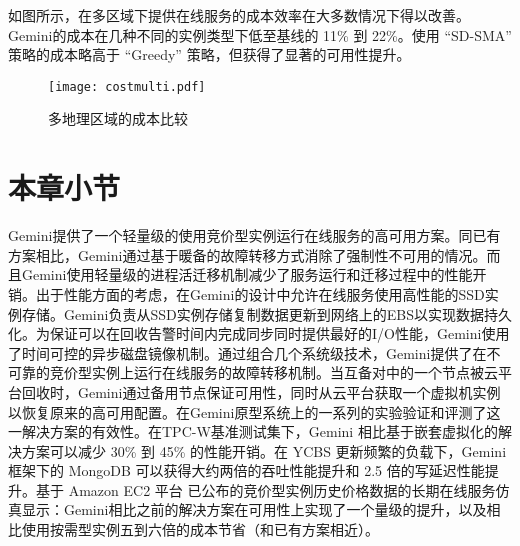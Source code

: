 如图所示，在多区域下提供在线服务的成本效率在大多数情况下得以改善。Gemini的成本在几种不同的实例类型下低至基线的 11\% 到 22\%。使用 ``SD-SMA'' 策略的成本略高于 ``Greedy'' 策略，但获得了显著的可用性提升。
\begin{figure}[]
  \centering
  \texttt{[image: costmulti.pdf]}
  \caption{多地理区域的成本比较}
  \label{figure:costmulti}
\end{figure}

\section{本章小节}
Gemini提供了一个轻量级的使用竞价型实例运行在线服务的高可用方案。同已有方案相比，Gemini通过基于暖备的故障转移方式消除了强制性不可用的情况。而且Gemini使用轻量级的进程活迁移机制减少了服务运行和迁移过程中的性能开销。出于性能方面的考虑，在Gemini的设计中允许在线服务使用高性能的SSD实例存储。Gemini负责从SSD实例存储复制数据更新到网络上的EBS以实现数据持久化。为保证可以在回收告警时间内完成同步同时提供最好的I/O性能，Gemini使用了时间可控的异步磁盘镜像机制。通过组合几个系统级技术，Gemini提供了在不可靠的竞价型实例上运行在线服务的故障转移机制。当互备对中的一个节点被云平台回收时，Gemini通过备用节点保证可用性，同时从云平台获取一个虚拟机实例以恢复原来的高可用配置。在Gemini原型系统上的一系列的实验验证和评测了这一解决方案的有效性。在TPC-W基准测试集下，Gemini 相比基于嵌套虚拟化的解决方案可以减少 30\% 到 45\% 的性能开销。在 YCBS 更新频繁的负载下，Gemini 框架下的 MongoDB 可以获得大约两倍的吞吐性能提升和 2.5 倍的写延迟性能提升。基于 Amazon EC2 平台 已公布的竞价型实例历史价格数据的长期在线服务仿真显示：Gemini相比之前的解决方案在可用性上实现了一个量级的提升，以及相比使用按需型实例五到六倍的成本节省（和已有方案相近）。